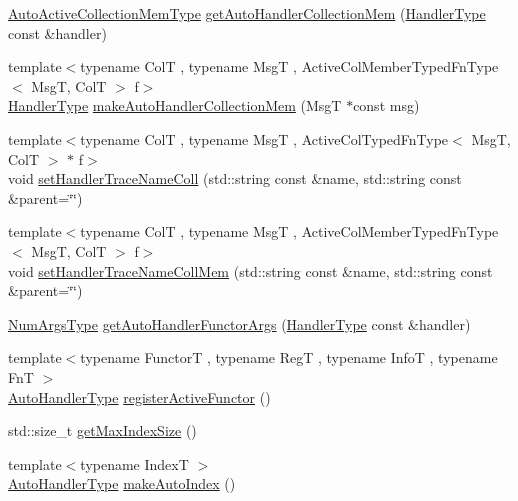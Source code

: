 \begin{DoxyCompactItemize}
\item 
\hyperlink{namespacevt_1_1auto__registry_aa217123c03472f9bcee51300d638b16e}{Auto\+Active\+Collection\+Mem\+Type} \hyperlink{namespacevt_1_1auto__registry_a7bcd3d732e686be4d6ab5501f6fb8dc3}{get\+Auto\+Handler\+Collection\+Mem} (\hyperlink{namespacevt_af64846b57dfcaf104da3ef6967917573}{Handler\+Type} const \&handler)
\item 
{\footnotesize template$<$typename ColT , typename MsgT , Active\+Col\+Member\+Typed\+Fn\+Type$<$ Msg\+T, Col\+T $>$ f$>$ }\\\hyperlink{namespacevt_af64846b57dfcaf104da3ef6967917573}{Handler\+Type} \hyperlink{namespacevt_1_1auto__registry_a7d30ee626941a98a46bdada71134d01e}{make\+Auto\+Handler\+Collection\+Mem} (MsgT $\ast$const msg)
\item 
{\footnotesize template$<$typename ColT , typename MsgT , Active\+Col\+Typed\+Fn\+Type$<$ Msg\+T, Col\+T $>$ $\ast$ f$>$ }\\void \hyperlink{namespacevt_1_1auto__registry_a2532642e28246a717542b6a62aa8e37a}{set\+Handler\+Trace\+Name\+Coll} (std\+::string const \&name, std\+::string const \&parent=\char`\"{}\char`\"{})
\item 
{\footnotesize template$<$typename ColT , typename MsgT , Active\+Col\+Member\+Typed\+Fn\+Type$<$ Msg\+T, Col\+T $>$ f$>$ }\\void \hyperlink{namespacevt_1_1auto__registry_a409d348d2435acd9ce36a38c12d13322}{set\+Handler\+Trace\+Name\+Coll\+Mem} (std\+::string const \&name, std\+::string const \&parent=\char`\"{}\char`\"{})
\item 
\hyperlink{namespacevt_1_1auto__registry_aebda1d9d765bc9147dc654ad0712c936}{Num\+Args\+Type} \hyperlink{namespacevt_1_1auto__registry_ae68422e2a7b216e19bc16988400b0d47}{get\+Auto\+Handler\+Functor\+Args} (\hyperlink{namespacevt_af64846b57dfcaf104da3ef6967917573}{Handler\+Type} const \&handler)
\item 
{\footnotesize template$<$typename FunctorT , typename RegT , typename InfoT , typename FnT $>$ }\\\hyperlink{namespacevt_1_1auto__registry_ae295e18699146815bb7d7674594d95d7}{Auto\+Handler\+Type} \hyperlink{namespacevt_1_1auto__registry_ab7e130e8790e4df4dc1d35476d1736e0}{register\+Active\+Functor} ()
\item 
std\+::size\+\_\+t \hyperlink{namespacevt_1_1auto__registry_a590741e9077c758629426d70ea37f4bf}{get\+Max\+Index\+Size} ()
\item 
{\footnotesize template$<$typename IndexT $>$ }\\\hyperlink{namespacevt_1_1auto__registry_ae295e18699146815bb7d7674594d95d7}{Auto\+Handler\+Type} \hyperlink{namespacevt_1_1auto__registry_a14e79eb6744c7f1584d46304356295e2}{make\+Auto\+Index} ()

\end{DoxyCompactItemize}
